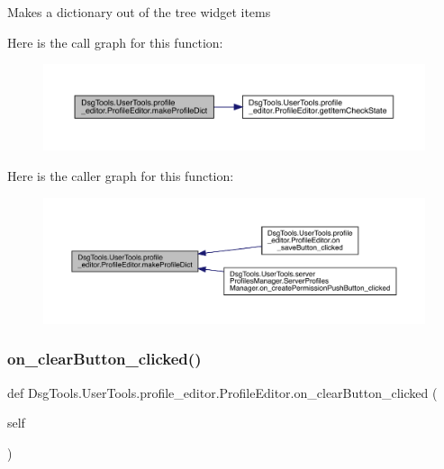 \begin{DoxyVerb}Makes a dictionary out of the tree widget items
\end{DoxyVerb}
 Here is the call graph for this function\+:
\nopagebreak
\begin{figure}[H]
\begin{center}
\leavevmode
\includegraphics[width=350pt]{class_dsg_tools_1_1_user_tools_1_1profile__editor_1_1_profile_editor_af7901665e57b8aee60db84aaf50c08da_cgraph}
\end{center}
\end{figure}
Here is the caller graph for this function\+:
\nopagebreak
\begin{figure}[H]
\begin{center}
\leavevmode
\includegraphics[width=350pt]{class_dsg_tools_1_1_user_tools_1_1profile__editor_1_1_profile_editor_af7901665e57b8aee60db84aaf50c08da_icgraph}
\end{center}
\end{figure}
\mbox{\label{class_dsg_tools_1_1_user_tools_1_1profile__editor_1_1_profile_editor_a3090f6ec86d1c2c7c1016065b38de165}} 
\subsubsection{\texorpdfstring{on\+\_\+clear\+Button\+\_\+clicked()}{on\_clearButton\_clicked()}}
{\footnotesize\ttfamily def Dsg\+Tools.\+User\+Tools.\+profile\+\_\+editor.\+Profile\+Editor.\+on\+\_\+clear\+Button\+\_\+clicked (\begin{DoxyParamCaption}\item[{}]{self }\end{DoxyParamCaption})}

